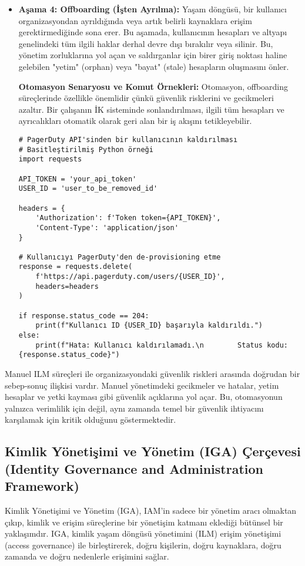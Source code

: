 \begin{itemize}
    \item \textbf{Aşama 4: Offboarding (İşten Ayrılma):} Yaşam döngüsü, bir kullanıcı organizasyondan ayrıldığında veya artık belirli kaynaklara erişim gerektirmediğinde sona erer. Bu aşamada, kullanıcının hesapları ve altyapı genelindeki tüm ilgili haklar derhal devre dışı bırakılır veya silinir. Bu, yönetim zorluklarına yol açan ve saldırganlar için birer giriş noktası haline gelebilen "yetim" (orphan) veya "bayat" (stale) hesapların oluşmasını önler.

    \textbf{Otomasyon Senaryosu ve Komut Örnekleri:} Otomasyon, offboarding süreçlerinde özellikle önemlidir çünkü güvenlik risklerini ve gecikmeleri azaltır. Bir çalışanın İK sisteminde sonlandırılması, ilgili tüm hesapları ve ayrıcalıkları otomatik olarak geri alan bir iş akışını tetikleyebilir.
\begin{verbatim}
# PagerDuty API'sinden bir kullanıcının kaldırılması
# Basitleştirilmiş Python örneği
import requests

API_TOKEN = 'your_api_token'
USER_ID = 'user_to_be_removed_id'

headers = {
    'Authorization': f'Token token={API_TOKEN}',
    'Content-Type': 'application/json'
}

# Kullanıcıyı PagerDuty'den de-provisioning etme
response = requests.delete(
    f'https://api.pagerduty.com/users/{USER_ID}', 
    headers=headers
)

if response.status_code == 204:
    print(f"Kullanıcı ID {USER_ID} başarıyla kaldırıldı.")
else:
    print(f"Hata: Kullanıcı kaldırılamadı.\n        Status kodu: {response.status_code}")
\end{verbatim}
\end{itemize}

Manuel ILM süreçleri ile organizasyondaki güvenlik riskleri arasında doğrudan bir sebep-sonuç ilişkisi vardır. Manuel yönetimdeki gecikmeler ve hatalar, yetim hesaplar ve yetki kayması gibi güvenlik açıklarına yol açar. Bu, otomasyonun yalnızca verimlilik için değil, aynı zamanda temel bir güvenlik ihtiyacını karşılamak için kritik olduğunu göstermektedir.

\subsection{Kimlik Yönetişimi ve Yönetim (IGA) Çerçevesi (Identity Governance and Administration Framework)}

Kimlik Yönetişimi ve Yönetim (IGA), IAM'in sadece bir yönetim aracı olmaktan çıkıp, kimlik ve erişim süreçlerine bir yönetişim katmanı eklediği bütünsel bir yaklaşımdır. IGA, kimlik yaşam döngüsü yönetimini (ILM) erişim yönetişimi (access governance) ile birleştirerek, doğru kişilerin, doğru kaynaklara, doğru zamanda ve doğru nedenlerle erişimini sağlar.

